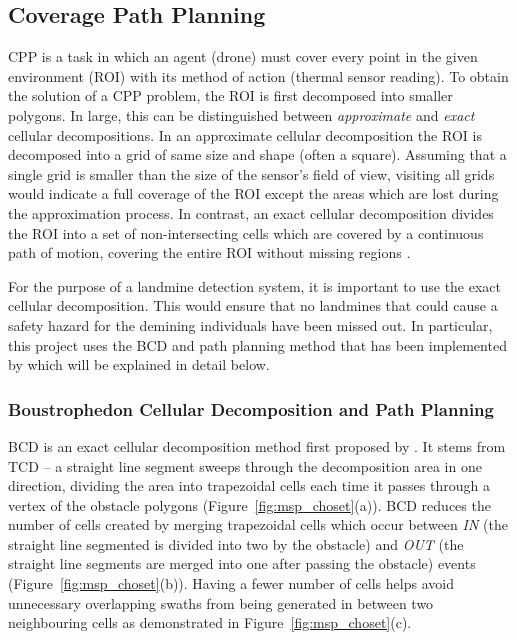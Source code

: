 \subsection{Coverage Path Planning}
\label{sec:msp_cpp}

\gls{CPP} is a task in which an agent (drone) must cover every point in the given environment (\gls{ROI}) with its method of action (thermal sensor reading). To obtain the solution of a \gls{CPP} problem, the \gls{ROI} is first decomposed into smaller polygons. In large, this can be distinguished between \textit{approximate} and \textit{exact} cellular decompositions. In an approximate cellular decomposition the \gls{ROI} is decomposed into a grid of same size and shape (often a square). Assuming that a single grid is smaller than the size of the sensor's field of view, visiting all grids would indicate a full coverage of the \gls{ROI} except the areas which are lost during the approximation process. In contrast, an exact cellular decomposition divides the \gls{ROI} into a set of non-intersecting cells which are covered by a continuous path of motion, covering the entire \gls{ROI} without missing regions \cite{choset2001surveycpp}. 

For the purpose of a landmine detection system, it is important to use the exact cellular decomposition. This would ensure that no landmines that could cause a safety hazard for the demining individuals have been missed out. In particular, this project uses the \gls{BCD} and path planning method that has been implemented by \cite{bahnemann2021cpp} which will be explained in detail below.  

\subsubsection{Boustrophedon Cellular Decomposition and Path Planning}

\gls{BCD} is an exact cellular decomposition method first proposed by \cite{choset1998bcd}. It stems from \gls{TCD} -- a straight line segment sweeps through the decomposition area in one direction, dividing the area into trapezoidal cells each time it passes through a vertex of the obstacle polygons (Figure~\ref{fig:msp_choset}(a)). \gls{BCD} reduces the number of cells created by merging trapezoidal cells which occur between \textit{IN} (the straight line segmented is divided into two by the obstacle) and \textit{OUT} (the straight line segments are merged into one after passing the obstacle) events (Figure~\ref{fig:msp_choset}(b)). Having a fewer number of cells helps avoid unnecessary overlapping swaths from being generated in between two neighbouring cells as demonstrated in Figure~\ref{fig:msp_choset}(c). 

